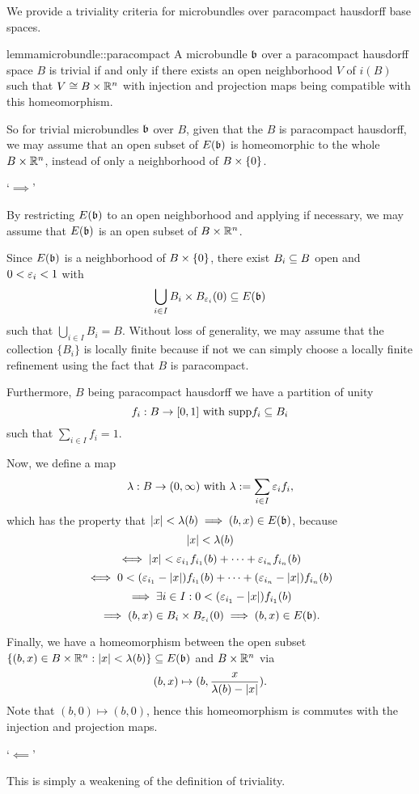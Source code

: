 \begin{myparagraph}
    We provide a triviality criteria for microbundles over paracompact hausdorff base spaces.
\end{myparagraph}

\begin{mystatement}{lemma}{microbundle::paracompact}
    A microbundle $\bb$ over a paracompact hausdorff space $B$ is trivial
    if and only if there exists an open neighborhood $V$ of $i(B)$ such that $V \cong B \times \mathbb{R}^n$
    with injection and projection maps being compatible with this homeomorphism.
\end{mystatement}

\begin{myparagraph}
    So for trivial microbundles $\bb$ over $B$, given that the $B$ is paracompact hausdorff,
    we may assume that an open subset of $E(\bb)$ is homeomorphic to the whole $B \times \mathbb{R}^n$,
    instead of only a neighborhood of $B \times{} \{0\}$.
\end{myparagraph}

\begin{myproof}
    `$\implies$'

    By restricting $E(\bb)$ to an open neighborhood
    and applying  if necessary,
    we may assume that $E(\bb)$ is an open subset of $B \times \mathbb{R}^n$.

    Since $E(\bb)$ is a neighborhood of $B \times{} \{0\}$, there exist $B_i \subseteq{} B$ open and $0 < \varepsilon{}_i < 1$ with
    \[ \bigcup_{i \in I } B_i \cross \ball[\eps_i] \sub E(\bb)\]
    such that $\bigcup_{i \in I} B_i = B$.
    Without loss of generality, we may assume that the collection $\{B_i\}$ is locally finite because if not
    we can simply choose a locally finite refinement using the fact that $B$ is paracompact.

    Furthermore, $B$ being paracompact hausdorff we have a partition of unity
    \[ f_i: B \to [0, 1] \text{ with } \text{supp}{f_i} \subseteq{} B_i\]
    such that $\sum_{i \in I}f_i = 1$.
    
    Now, we define a map
    \[ \lambda: B \to (0, \infty) \text{ with } \lambda := \sum_{i \in I} \varepsilon{}_i f_i, \]
    which has the property that $\abs{x} < \lambda(b) \implies (b, x) \in E(\bb)$, because
    \[ \vert{} x \vert{} < \lambda(b) \]
    \[ \iff  \vert{} x \vert{} < \varepsilon{}_{i_1} f_{i_1}(b) + \cdots + \varepsilon{}_{i_n} f_{i_n}(b) \]
    \[ \iff 0 < (\varepsilon{}_{i_1} - \vert{} x \vert{}) f_{i_1}(b) + \cdots + (\varepsilon{}_{i_n} - \vert{} x \vert{}) f_{i_n}(b) \]
    \[ \implies \exists i \in I: 0 < (\varepsilon{}_{i_1} - \vert{} x \vert{}) f_{i_1}(b) \]
    \[ \implies (b, x) \in B_i \cross \ball[\eps_i]  \implies (b, x) \in E(\bb). \]

    Finally, we have a homeomorphism between the open subset
    $\set{(b, x) \in B \cross \R^n}{\abs{x} < \lambda(b)} \sub E(\bb)$ and $B \times \mathbb{R}^n$ via
    \[ (b, x) \mapsto (b, \frac{x}{\lambda(b) - \vert{} x \vert{}}). \]
    Note that $(b, 0) \mapsto (b, 0)$, hence this homeomorphism
    is commutes with the injection and projection maps.

    `$\impliedby$'

    This is simply a weakening of the definition of triviality. 
\end{myproof}